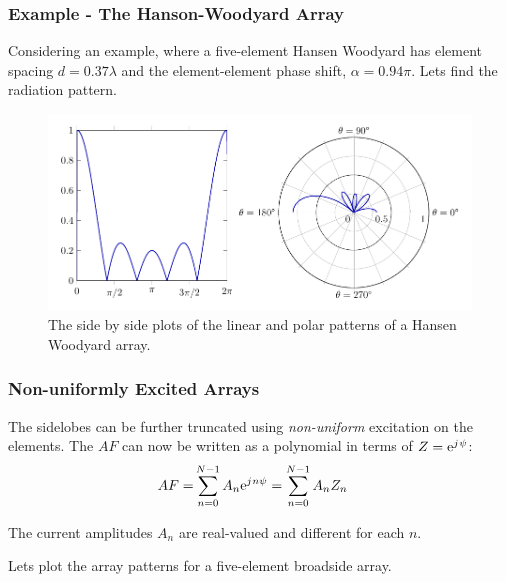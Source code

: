 \documentclass[10pt]{beamer}
\newcommand{\e}{\mathrm{e}} %
\renewcommand{\j}{{j}\mkern1mu} %
\begin{document}
\begin{frame}
    \frametitle{Example - The Hanson-Woodyard Array}
Considering an example, where a five-element Hansen Woodyard has element spacing $d  = 0.37 \lambda$ and the element-element phase shift, $\alpha = 0.94 \pi$. Lets find the radiation pattern.

\begin{figure}[h!]
    \centering
    \includegraphics[width = .9 \textwidth]{Hansen Woodyard.pdf}
    \caption{The side by side plots of the linear and polar patterns of a Hansen Woodyard array.}
\end{figure}
\end{frame}


\begin{frame}
    \frametitle{Non-uniformly Excited Arrays}
The sidelobes can be further truncated using \textit{non-uniform} excitation on the elements. The $AF$ can now be written as a polynomial in terms of $Z = \e^{\j \psi}$:
\begin{align*}
    AF {}=& \sum_{n = 0}^{N-1} A_n \e^{\j n \psi} = \sum_{n = 0}^{N-1} A_n Z_n
\end{align*}

The current amplitudes $A_n$ are real-valued and different for each $n$.

Lets plot the array patterns for a five-element broadside array.

\end{frame}
\end{document}
